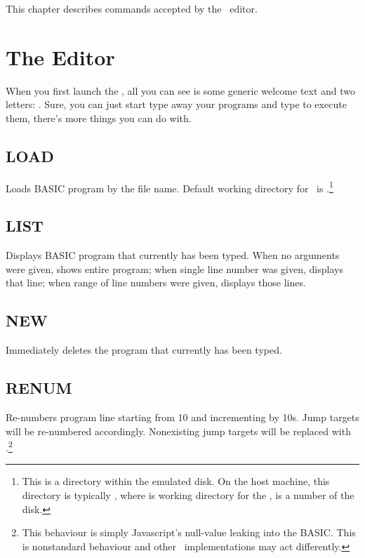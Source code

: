 This chapter describes commands accepted by the \tbas\ editor.

\section{The Editor}

When you first launch the \tbas, all you can see is some generic welcome text and two letters: . Sure, you can just start type away your programs and type  to execute them, there's more things you can do with.

\subsection{LOAD}
    \par
    Loads BASIC program by the file name. Default working directory for \tbas\ is .\footnote{This is a directory within the emulated disk. On the host machine, this directory is typically , where  is working directory for the \thismachine,  is a number of the disk.}
    
\subsection{LIST}
    \par
    Displays BASIC program that currently has been typed. When no arguments were given, shows entire program; when single line number was given, displays that line; when range of line numbers were given, displays those lines.
    
\subsection{NEW}
    \par
    Immediately deletes the program that currently has been typed.
    
\subsection{RENUM}
    \par
    Re-numbers program line starting from 10 and incrementing by 10s. Jump targets will be re-numbered accordingly. Nonexisting jump targets will be replaced with .\footnote{This behaviour is simply Javascript's null-value leaking into the BASIC. This is nonstandard behaviour and other \tbas\ implementations may act differently.}
    
